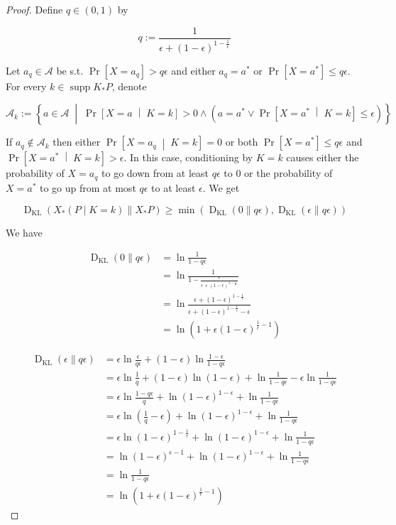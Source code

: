 \documentclass[anon,12pt]{colt2018} %
\DeclareMathOperator{\Supp}{supp}
\newcommand{\AP}[1]{\left(#1\right)}
\newcommand{\AB}[1]{\left[#1\right]}
\newcommand{\ABM}[2]{\left[#1\;\middle\vert\;#2\right]}
\newcommand{\ACM}[2]{\left\{#1\;\middle\vert\;#2\right\}}
\newcommand{\Pa}[2]{\underset{#1}{\operatorname{Pr}}\AB{#2}}
\newcommand{\CP}[3]{\underset{#1}{\operatorname{Pr}}\ABM{#2}{#3}}
\newcommand{\KL}[2]{\operatorname{D}_{\mathrm{KL}}(#1 \| #2)}
\newcommand{\A}{\mathcal{A}}
\begin{document}
\begin{proof}

Define $q \in (0,1)$ by

$$q:=\frac{1}{\epsilon+(1-\epsilon)^{1-\frac{1}{\epsilon}}}$$

Let $a_q \in \A$ be s.t. $\Pa{}{X=a_q} > q\epsilon$ and either $a_q = a^*$ or $\Pa{}{X=a^*} \leq q\epsilon$. For every $k \in \Supp{K_*P}$, denote

$$\A_k := \ACM{a \in \A}{\CP{}{X=a}{K=k} > 0 \land \AP{a = a^* \lor \CP{}{X=a^*}{K=k} \leq \epsilon}}$$

If $a_q \not\in \A_k$ then either $\CP{}{X=a_q}{K=k}=0$ or both $\Pa{}{X=a^*}\leq q\epsilon$ and\\ $\CP{}{X=a^*}{K=k} > \epsilon$. In this case, conditioning by $K = k$ causes either the probability of $X = a_q$ to go down from at least $q\epsilon$ to $0$ or the probability of $X = a^*$ to go up from at most $q\epsilon$ to at least $\epsilon$. We get

$$\KL{X_*(P \mid K = k)}{X_*P} \geq \min\AP{\KL{0}{q\epsilon},\KL{\epsilon}{q\epsilon}}$$

We have

\begin{align*}
\KL{0}{q\epsilon} &= \ln{\frac{1}{1-q\epsilon}}\\
&=\ln{\frac{1}{1-\frac{\epsilon}{\epsilon+(1-\epsilon)^{1-\frac{1}{\epsilon}}}}}\\
&=\ln{\frac{\epsilon+(1-\epsilon)^{1-\frac{1}{\epsilon}}}{\epsilon+(1-\epsilon)^{1-\frac{1}{\epsilon}}-\epsilon}}\\ &=\ln{\AP{1+\epsilon(1-\epsilon)^{\frac{1}{\epsilon}-1}}} 
\end{align*}

\begin{align*}
\KL{\epsilon}{q\epsilon} &= \epsilon \ln{\frac{\epsilon}{q\epsilon }}+(1-\epsilon)\ln{\frac{1-\epsilon}{1-q\epsilon}}\\
&= \epsilon \ln{\frac{1}{q}}+(1-\epsilon)\ln{(1-\epsilon)} +\ln{\frac{1}{1-q\epsilon}}- \epsilon \ln{\frac{1}{1-q\epsilon}}\\
&= \epsilon \ln{\frac{1-q\epsilon}{q}}+\ln{(1-\epsilon)^{1-\epsilon}} +\ln{\frac{1}{1-q\epsilon}}\\
&= \epsilon \ln{\AP{\frac{1}{q}-\epsilon}}+\ln{(1-\epsilon)^{1-\epsilon}} +\ln{\frac{1}{1-q\epsilon}}\\
&= \epsilon \ln{(1-\epsilon)^{1-\frac{1}{\epsilon}}}+\ln{(1-\epsilon)^{1-\epsilon}} +\ln{\frac{1}{1-q\epsilon}}\\
&= \ln{(1-\epsilon)^{\epsilon-1}}+\ln{(1-\epsilon)^{1-\epsilon}} +\ln{\frac{1}{1-q\epsilon}}\\
&=\ln{\frac{1}{1-q\epsilon}}\\
&=\ln{\AP{1+\epsilon(1-\epsilon)^{\frac{1}{\epsilon}-1}}}
\end{align*}


\end{proof}
\end{document}
